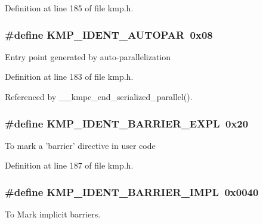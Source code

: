 Definition at line 185 of file kmp.\-h.

\hypertarget{group__BASIC__TYPES_ga744ef043bd848d5e338b4c72ef247adc}{
\subsubsection[{K\-M\-P\-\_\-\-I\-D\-E\-N\-T\-\_\-\-A\-U\-T\-O\-P\-A\-R}]{\setlength{\rightskip}{0pt plus 5cm}\#define K\-M\-P\-\_\-\-I\-D\-E\-N\-T\-\_\-\-A\-U\-T\-O\-P\-A\-R~0x08}}\label{group__BASIC__TYPES_ga744ef043bd848d5e338b4c72ef247adc}
Entry point generated by auto-\/parallelization 

Definition at line 183 of file kmp.\-h.



Referenced by \-\_\-\-\_\-kmpc\-\_\-end\-\_\-serialized\-\_\-parallel().

\hypertarget{group__BASIC__TYPES_ga7358cc60d0f006b36752a1795e6d5d93}{
\subsubsection[{K\-M\-P\-\_\-\-I\-D\-E\-N\-T\-\_\-\-B\-A\-R\-R\-I\-E\-R\-\_\-\-E\-X\-P\-L}]{\setlength{\rightskip}{0pt plus 5cm}\#define K\-M\-P\-\_\-\-I\-D\-E\-N\-T\-\_\-\-B\-A\-R\-R\-I\-E\-R\-\_\-\-E\-X\-P\-L~0x20}}\label{group__BASIC__TYPES_ga7358cc60d0f006b36752a1795e6d5d93}
To mark a 'barrier' directive in user code 

Definition at line 187 of file kmp.\-h.

\hypertarget{group__BASIC__TYPES_gaaffb56f3d5bd8803b41e9862e2aeb863}{
\subsubsection[{K\-M\-P\-\_\-\-I\-D\-E\-N\-T\-\_\-\-B\-A\-R\-R\-I\-E\-R\-\_\-\-I\-M\-P\-L}]{\setlength{\rightskip}{0pt plus 5cm}\#define K\-M\-P\-\_\-\-I\-D\-E\-N\-T\-\_\-\-B\-A\-R\-R\-I\-E\-R\-\_\-\-I\-M\-P\-L~0x0040}}\label{group__BASIC__TYPES_gaaffb56f3d5bd8803b41e9862e2aeb863}
To Mark implicit barriers. 

